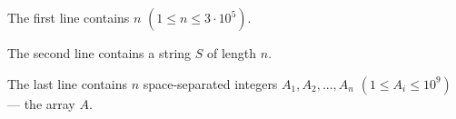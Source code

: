 The first line contains $n$ $(1 ≤ n ≤ 3 \cdot 10^5)$.

The second line contains a string $S$ of length $n$.

The last line contains $n$ space-separated integers $A_1, A_2, ..., A_n$ $(1 ≤ A_i ≤ 10^9)$ --- the array $A$.